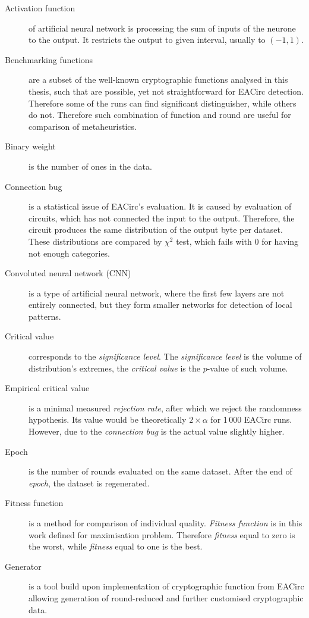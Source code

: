 \documentclass[
    digital,    %
    oneside,    %
    color,
    11pt,
    nocover,
    notable,
    nolof,
    nolot,
]{fithesis3}
\begin{document}
\begin{description}
\item[Activation function] of artificial neural network is processing the sum of inputs of the neurone to the output. It restricts the output to given interval, usually to $(-1, 1)$.
\item[Benchmarking functions] are a subset of the well-known cryptographic functions analysed in this thesis, such that are possible, yet not straightforward for EACirc detection. Therefore some of the runs can find significant distinguisher, while others do not. Therefore such combination of function and round are useful for comparison of metaheuristics.
\item[Binary weight] is the number of ones in the data.
\item[Connection bug] is a statistical issue of EACirc's evaluation. It is caused by evaluation of circuits, which has not connected the input to the output. Therefore, the circuit produces the same distribution of the output byte per dataset. These distributions are compared by $\chi^{2}$ test, which fails with 0 for having not enough categories.
\item[Convoluted neural network (CNN)] is a type of artificial neural network, where the first few layers are not entirely connected, but they form smaller networks for detection of local patterns.
\item[Critical value] corresponds to the \textit{significance level}. The \textit{significance level} is the volume of distribution's extremes, the \textit{critical value} is the $p$-value of such volume.
\item[Empirical critical value] is a minimal measured \textit{rejection rate}, after which we reject the randomness hypothesis. Its value would be theoretically $2\times \alpha$  for 1\,000 EACirc runs. However, due to the \textit{connection bug} is the actual value slightly higher.
\item[Epoch] is the number of rounds evaluated on the same dataset. After the end of \textit{epoch}, the dataset is regenerated.
\item[Fitness function] is a method for comparison of individual quality. \textit{Fitness function} is in this work defined for maximisation problem. Therefore \textit{fitness} equal to zero is the worst, while \textit{fitness} equal to one is the best.
\item[Generator] is a tool build upon implementation of cryptographic function from EACirc allowing generation of round-reduced and further customised cryptographic data.

\end{description}
\end{document}
